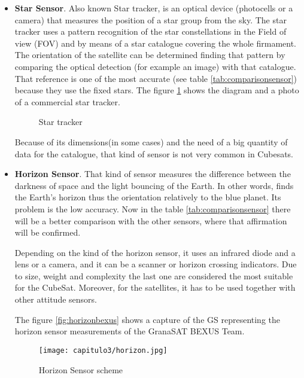\begin{itemize}

\item \textbf{Star Sensor}. Also known Star tracker, is an optical device (photocells or a camera) that measures the position of a star group from the sky. The star tracker uses a pattern recognition of the star constellations in the Field of view (\acrshort{FOV}) and by means of a star catalogue covering the whole firmament. The orientation of the satellite can be determined finding that pattern by comparing the optical detection (for example an image) with that catalogue. That reference is one of the most accurate (see table \ref{tab:comparisonsensor}) because they use the fixed stars. The figure \ref{fig:startracker}  shows the diagram and a photo of a commercial star tracker. 
\begin{figure}[H]
\centering
{}
\caption{Star tracker} \label{fig:startracker}
\end{figure}

Because of its dimensions(in some cases) and the need of a big quantity of data for the catalogue, that kind of sensor is not very common in Cubesats.
\item \textbf{Horizon Sensor}. That kind of sensor measures the difference between the darkness of space and the light bouncing of the Earth. In other words, finds the Earth’s horizon thus the orientation relatively to the blue planet. Its problem is the low accuracy. Now in the table \ref{tab:comparisonsensor} there will be a better comparison with the other sensors, where that affirmation will be confirmed.

Depending on the kind of the horizon sensor, it uses an infrared diode and a lens or a camera, and it can be a scanner or horizon crossing indicators.  Due to size, weight and complexity the last one are considered the most suitable for the CubeSat. Moreover, for the satellites, it has to be used together with other attitude sensors.

The figure \ref{fig:horizonbexus} shows a capture of the \acrshort{GS} representing the horizon sensor measurements of the GranaSAT BEXUS Team.

\begin{figure}[H]
	\centering
		\texttt{[image: capitulo3/horizon.jpg]}
	\caption{Horizon Sensor scheme \cite{carlos}}
	\label{fig:horizon}
\end{figure}


\end{itemize}
